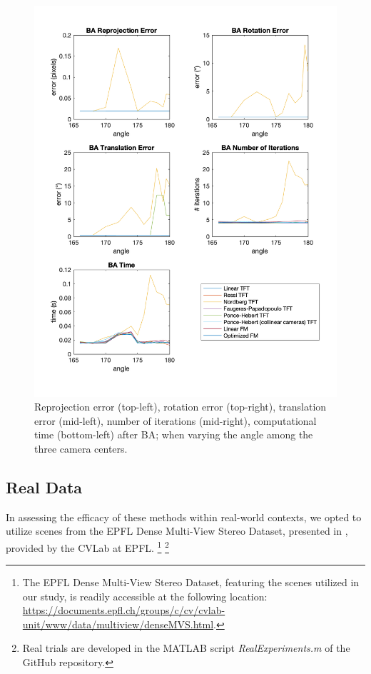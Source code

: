 \begin{figure}[p]
	\centering
	\includegraphics[width=1\textwidth]{Experiments/Synthetic/angle/BAanglePlots.png}
	\caption[Synthetic Trial varying Camera Centers Angle with \acs{BA}]{Reprojection error (top-left), rotation error (top-right), translation error (mid-left), number of iterations (mid-right), computational time (bottom-left) after \acs{BA}; when varying the angle among the three camera centers.}
	\label{fig:BAAnglePlot}
\end{figure}

\pagebreak

\subsection{Real Data}
In assessing the efficacy of these methods within real-world contexts, we opted to utilize scenes from the EPFL Dense Multi-View Stereo Dataset, presented in \cite{13-epfl-dataset}, provided by the CVLab at EPFL. \footnote{The EPFL Dense Multi-View Stereo Dataset, featuring the scenes utilized in our study, is readily accessible at the following location: \href{https://documents.epfl.ch/groups/c/cv/cvlab-unit/www/data/multiview/denseMVS.html}{https://documents.epfl.ch/groups/c/cv/cvlab-unit/www/data/multiview/denseMVS.html}.} \footnote{Real trials are developed in the MATLAB script \textit{RealExperiments.m} of the GitHub repository.}\\

